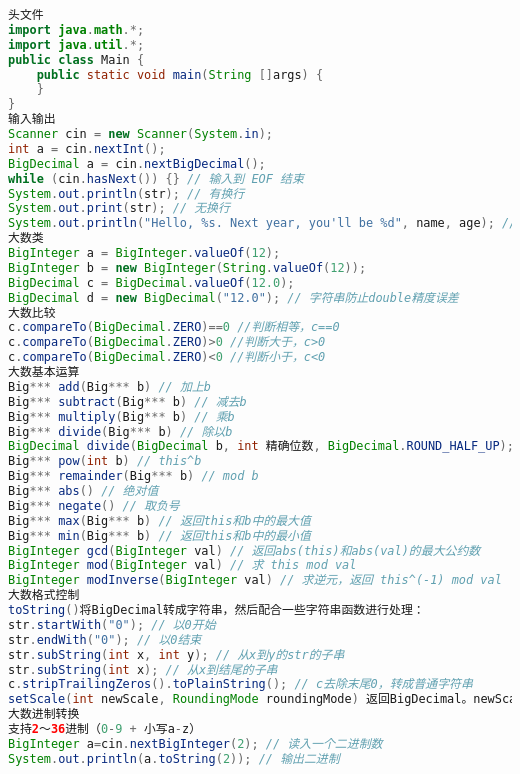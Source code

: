 \documentclass[landscape,a4paper]{article}
\begin{document}
\begin{lstlisting}[language=java]
头文件
import java.math.*;
import java.util.*;
public class Main {
	public static void main(String []args) {
	}
}
输入输出
Scanner cin = new Scanner(System.in);
int a = cin.nextInt();
BigDecimal a = cin.nextBigDecimal();
while (cin.hasNext()) {} // 输入到 EOF 结束
System.out.println(str); // 有换行
System.out.print(str); // 无换行
System.out.println("Hello, %s. Next year, you'll be %d", name, age); // C风格输出
大数类
BigInteger a = BigInteger.valueOf(12);
BigInteger b = new BigInteger(String.valueOf(12));
BigDecimal c = BigDecimal.valueOf(12.0);
BigDecimal d = new BigDecimal("12.0"); // 字符串防止double精度误差
大数比较
c.compareTo(BigDecimal.ZERO)==0 //判断相等，c==0
c.compareTo(BigDecimal.ZERO)>0 //判断大于，c>0
c.compareTo(BigDecimal.ZERO)<0 //判断小于，c<0
大数基本运算
Big*** add(Big*** b) // 加上b
Big*** subtract(Big*** b) // 减去b
Big*** multiply(Big*** b) // 乘b
Big*** divide(Big*** b) // 除以b
BigDecimal divide(BigDecimal b, int 精确位数, BigDecimal.ROUND_HALF_UP); // 除以b，保留小数
Big*** pow(int b) // this^b
Big*** remainder(Big*** b) // mod b
Big*** abs() // 绝对值
Big*** negate() // 取负号
Big*** max(Big*** b) // 返回this和b中的最大值
Big*** min(Big*** b) // 返回this和b中的最小值
BigInteger gcd(BigInteger val) // 返回abs(this)和abs(val)的最大公约数
BigInteger mod(BigInteger val) // 求 this mod val
BigInteger modInverse(BigInteger val) // 求逆元，返回 this^(-1) mod val
大数格式控制
toString()将BigDecimal转成字符串，然后配合一些字符串函数进行处理：
str.startWith("0"); // 以0开始
str.endWith("0"); // 以0结束
str.subString(int x, int y); // 从x到y的str的子串
str.subString(int x); // 从x到结尾的子串
c.stripTrailingZeros().toPlainString(); // c去除末尾0，转成普通字符串
setScale(int newScale, RoundingMode roundingMode) 返回BigDecimal。newScale表示保留位数。CEILING/DOWN/FLOOR/HALF_DOWN/HALF_UP。
大数进制转换
支持2～36进制（0-9 + 小写a-z）
BigInteger a=cin.nextBigInteger(2); // 读入一个二进制数
System.out.println(a.toString(2)); // 输出二进制
\end{lstlisting}
\end{document}
